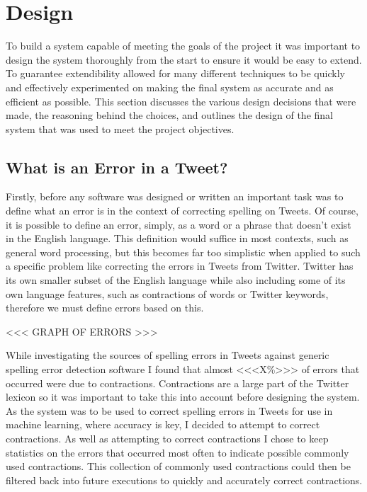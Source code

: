 \chapter{Design}

To build a system capable of meeting the goals of the project it was important to design the system thoroughly from the start to ensure it would be easy to extend. To guarantee extendibility allowed for many different techniques to be quickly and effectively experimented on making the final system as accurate and as efficient as possible. This section discusses the various design decisions that were made, the reasoning behind the choices, and outlines the design of the final system that was used to meet the project objectives.

\section{What is an Error in a Tweet?}
Firstly, before any software was designed or written an important task was to define what an error is in the context of correcting spelling on Tweets. Of course, it is possible to define an error, simply, as a word or a phrase that doesn't exist in the English language. This definition would suffice in most contexts, such as general word processing, but this becomes far too simplistic when applied to such a specific problem like correcting the errors in Tweets from Twitter. Twitter has its own smaller subset of the English language while also including some of its own language features, such as contractions of words or Twitter keywords, therefore we must define errors based on this.

<<< GRAPH OF ERRORS >>>

While investigating the sources of spelling errors in Tweets against generic spelling error detection software I found that almost <<<X\%>>> of errors that occurred were due to contractions. Contractions are a large part of the Twitter lexicon so it was important to take this into account before designing the system. As the system was to be used to correct spelling errors in Tweets for use in machine learning, where accuracy is key, I decided to attempt to correct contractions. As well as attempting to correct contractions I chose to keep statistics on the errors that occurred most often to indicate possible commonly used contractions. This collection of commonly used contractions could then be filtered back into future executions to quickly and accurately correct contractions.


